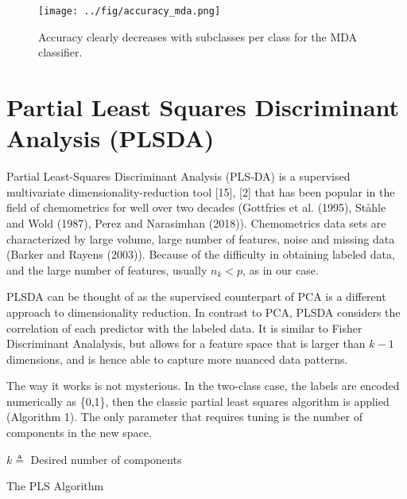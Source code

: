 \documentclass[conference,final,]{IEEEtran}
\makeatletter
\def\maxwidth{\ifdim\Gin@nat@width>\linewidth\linewidth
\else\Gin@nat@width\fi}
\let\Oldincludegraphics\includegraphics
\renewcommand{\includegraphics}[1]{\Oldincludegraphics[width=\maxwidth]{#1}}
\makeatother
\begin{document}
\begin{figure}
\centering
\texttt{[image: ../fig/accuracy\_mda.png]}
\caption{Accuracy clearly decreases with subclasses per class for the
MDA classifier.}
\end{figure}

\hypertarget{partial-least-squares-discriminant-analysis-plsda}{%
\section{Partial Least Squares Discriminant Analysis
(PLSDA)}\label{partial-least-squares-discriminant-analysis-plsda}}

Partial Least-Squares Discriminant Analysis (PLS-DA) is a supervised
multivariate dimensionality-reduction tool {[}15{]}, {[}2{]} that has
been popular in the field of chemometrics for well over two decades
(Gottfries et al. (1995), Ståhle and Wold (1987), Perez and Narasimhan
(2018)). Chemometrics data sets are characterized by large volume, large
number of features, noise and missing data (Barker and Rayens (2003)).
Because of the difficulty in obtaining labeled data, and the large
number of features, usually \(n_k<p\), as in our case.

PLSDA can be thought of as the supervised counterpart of PCA is a
different approach to dimensionality reduction. In contrast to PCA,
PLSDA considers the correlation of each predictor with the labeled data.
It is similar to Fisher Discriminant Analalysis, but allows for a
feature space that is larger than \(k-1\) dimensions, and is hence able
to capture more nuanced data patterns.

The way it works is not mysterious. In the two-class case, the labels
are encoded numerically as \{0,1\}, then the classic partial least
squares algorithm is applied (Algorithm 1). The only parameter that
requires tuning is the number of components in the new space.

\begin{algorithm}
 $k \triangleq$ Desired number of components
 
  

\caption{The PLS Algorithm}

\end{algorithm}
\end{document}

